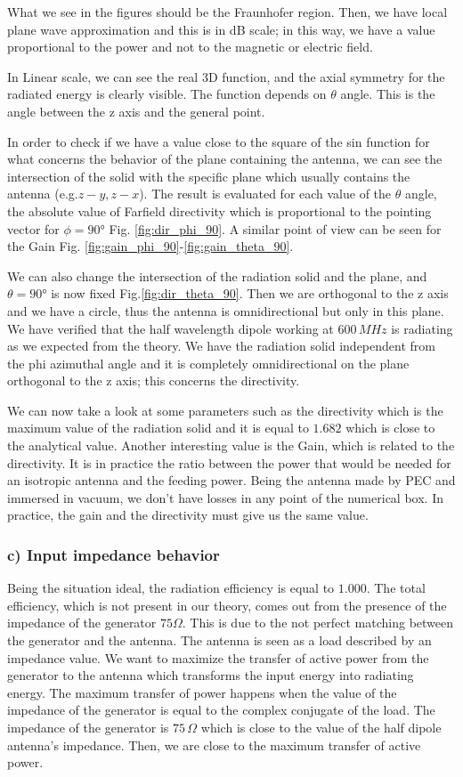 \documentclass{article}
\begin{document}
What we see in the figures should be the Fraunhofer region. Then, we have local plane wave approximation and this is in dB scale; in this way, we have a value proportional to the power and not to the magnetic or electric field.

In Linear scale, we can see the real 3D function, and the axial symmetry for the radiated energy is clearly visible. The function depends on $\theta$ angle. This is the angle between the z axis and the general point.

In order to check if we have a value close to the square of the sin function for what concerns the behavior of the plane containing the antenna, we can see the intersection of the solid with the specific plane which usually contains the antenna (e.g.$ z-y, z-x$). The result is evaluated for each value of the $\theta$ angle, the absolute value of Farfield directivity which is proportional to the pointing vector for $\phi = 90°$ Fig. \ref{fig:dir_phi_90}. A similar point of view can be seen for the Gain Fig. \ref{fig:gain_phi_90}-\ref{fig:gain_theta_90}.

We can also change the intersection of the radiation solid and the plane, and $\theta = 90°$ is now fixed Fig.\ref{fig:dir_theta_90}. Then we are orthogonal to the z axis and we have a circle, thus the antenna is omnidirectional but only in this plane.
We have verified that the half wavelength dipole working at $600 \, MHz$ is radiating as we expected from the theory. We have the radiation solid independent from the phi azimuthal angle and it is completely omnidirectional on the plane orthogonal to the z axis; this concerns the directivity.

We can now take a look at some parameters such as the directivity which is the maximum value of the radiation solid and it is equal to $1.682$ which is close to the analytical value.
Another interesting value is the Gain, which is related to the directivity. It is in practice the ratio between the power that would be needed for an isotropic antenna and the feeding power. Being the antenna made by PEC and immersed in vacuum, we don't have losses in any point of the numerical box. In practice, the gain and the directivity must give us the same value.

\subsubsection{c) Input impedance behavior}
Being the situation ideal, the radiation efficiency is equal to $1.000$. The total efficiency, which is not present in our theory, comes out from the presence of the impedance of the generator $75 \Omega$. This is due to the not perfect matching between the generator and the antenna. The antenna is seen as a load described by an impedance value. We want to maximize the transfer of active power from the generator to the antenna which transforms the input energy into radiating energy. The maximum transfer of power happens when the value of the impedance of the generator is equal to the complex conjugate of the load. The impedance of the generator is $75 \,\Omega$ which is close to the value of the half dipole antenna's impedance. Then, we are close to the maximum transfer of active power. 
\end{document}
